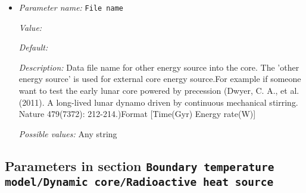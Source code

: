 \begin{itemize}
\item {\it Parameter name:} {\tt File name}
\label{parameters:Boundary temperature model/Dynamic core/Other energy source/File name}
\label{parameters:Boundary_20temperature_20model/Dynamic_20core/Other_20energy_20source/File_20name}


{\it Value:} 


{\it Default:} 


{\it Description:} Data file name for other energy source into the core. The 'other energy source' is used for external core energy source.For example if someone want to test the early lunar core powered by precession (Dwyer, C. A., et al. (2011). A long-lived lunar dynamo driven by continuous mechanical stirring. Nature 479(7372): 212-214.)Format [Time(Gyr)   Energy rate(W)]


{\it Possible values:} Any string
\end{itemize}

\subsection{Parameters in section \tt Boundary temperature model/Dynamic core/Radioactive heat source}
\label{parameters:Boundary_20temperature_20model/Dynamic_20core/Radioactive_20heat_20source}

